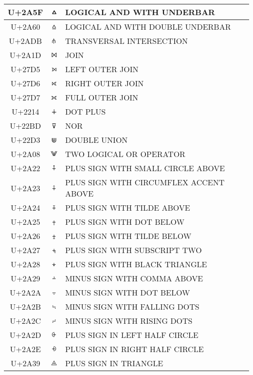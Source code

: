 \documentclass[a4paper]{article}
\begin{document}
\begin{longtable}{ccl}
  U+2A5F & \texttt{⩟}  & LOGICAL AND WITH UNDERBAR \\ \hline
  U+2A60 & \texttt{⩠}  & LOGICAL AND WITH DOUBLE UNDERBAR \\ \hline
  U+2ADB & \texttt{⫛}  & TRANSVERSAL INTERSECTION \\ \hline
  U+2A1D & \texttt{⨝}  & JOIN \\ \hline
  U+27D5 & \texttt{⟕}  & LEFT OUTER JOIN \\ \hline
  U+27D6 & \texttt{⟖}  & RIGHT OUTER JOIN \\ \hline
  U+27D7 & \texttt{⟗}  & FULL OUTER JOIN \\ \hline
  U+2214 & \texttt{∔}  & DOT PLUS \\ \hline
  U+22BD & \texttt{⊽}  & NOR \\ \hline
  U+22D3 & \texttt{⋓}  & DOUBLE UNION \\ \hline
  U+2A08 & \texttt{⨈}  & TWO LOGICAL OR OPERATOR \\ \hline
  U+2A22 & \texttt{⨢}  & PLUS SIGN WITH SMALL CIRCLE ABOVE \\ \hline
  U+2A23 & \texttt{⨣}  & PLUS SIGN WITH CIRCUMFLEX ACCENT ABOVE \\ \hline
  U+2A24 & \texttt{⨤}  & PLUS SIGN WITH TILDE ABOVE \\ \hline
  U+2A25 & \texttt{⨥}  & PLUS SIGN WITH DOT BELOW \\ \hline
  U+2A26 & \texttt{⨦}  & PLUS SIGN WITH TILDE BELOW \\ \hline
  U+2A27 & \texttt{⨧}  & PLUS SIGN WITH SUBSCRIPT TWO \\ \hline
  U+2A28 & \texttt{⨨}  & PLUS SIGN WITH BLACK TRIANGLE \\ \hline
  U+2A29 & \texttt{⨩}  & MINUS SIGN WITH COMMA ABOVE \\ \hline
  U+2A2A & \texttt{⨪}  & MINUS SIGN WITH DOT BELOW \\ \hline
  U+2A2B & \texttt{⨫}  & MINUS SIGN WITH FALLING DOTS \\ \hline
  U+2A2C & \texttt{⨬}  & MINUS SIGN WITH RISING DOTS \\ \hline
  U+2A2D & \texttt{⨭}  & PLUS SIGN IN LEFT HALF CIRCLE \\ \hline
  U+2A2E & \texttt{⨮}  & PLUS SIGN IN RIGHT HALF CIRCLE \\ \hline
  U+2A39 & \texttt{⨹}  & PLUS SIGN IN TRIANGLE \\ \hline

\end{longtable}
\end{document}
